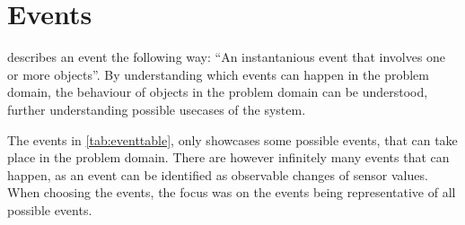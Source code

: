 \section{Events}\label{sec:events}

\citet{OOAD} describes an event the following way: \enquote{An instantanious event that involves one or more objects}. By understanding which events can happen in the problem domain, the behaviour of objects in the problem domain can be understood, further understanding possible usecases of the system.

The events in \cref{tab:eventtable}, only showcases some possible events, that can take place in the problem domain. There are however infinitely many events that can happen, as an event can be identified as observable changes of sensor values. When choosing the events, the focus was on the events being representative of all possible events.

